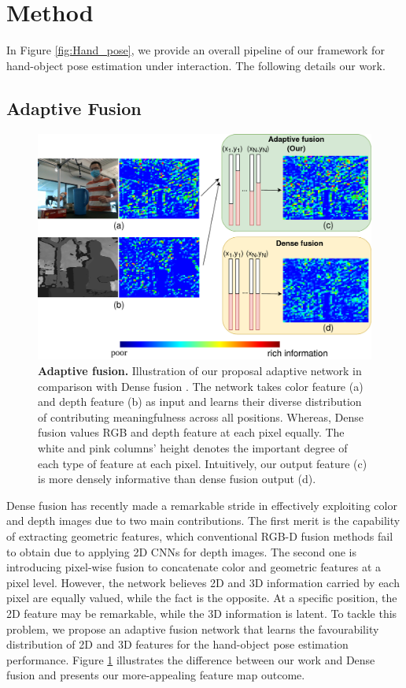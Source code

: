 \section{Method}
\label{sec:methodology}

In Figure \ref{fig:Hand_pose}, we provide an overall pipeline of our framework for hand-object pose estimation under interaction. The following details our work.

\subsection{Adaptive Fusion}
\label{sec:adaptive_fusion}

\begin{figure}[h!]
	\centering
	\includegraphics[width=0.95\linewidth]{Figs/Adaptive_fusion.png}
	\caption{\textbf{Adaptive fusion.} Illustration of our proposal adaptive network in comparison with Dense fusion \cite{wang2019densefusion}. The network takes color feature (a) and depth feature (b) as input and learns their diverse distribution of contributing meaningfulness across all positions. Whereas, Dense fusion values RGB and depth feature at each pixel equally. The white and pink columns' height denotes the important degree of each type of feature at each pixel. Intuitively, our output feature (c) is more densely informative than dense fusion output (d).}
	\label{fig:adaptive_fusion}
\end{figure}

Dense fusion \cite{wang2019densefusion} has recently made a remarkable stride in effectively exploiting color and depth images due to two main contributions. The first merit is the capability of extracting geometric features, which conventional RGB-D fusion methods fail to obtain due to applying 2D CNNs for depth images. The second one is introducing pixel-wise fusion to concatenate color and geometric features at a pixel level. However, the network believes 2D and 3D information carried by each pixel are equally valued, while the fact is the opposite. At a specific position, the 2D feature may be remarkable, while the 3D information is latent. To tackle this problem, we propose an adaptive fusion network that learns the favourability distribution of 2D and 3D features for the hand-object pose estimation performance. Figure \ref{fig:adaptive_fusion} illustrates the difference between our work and Dense fusion and presents our more-appealing feature map outcome.

